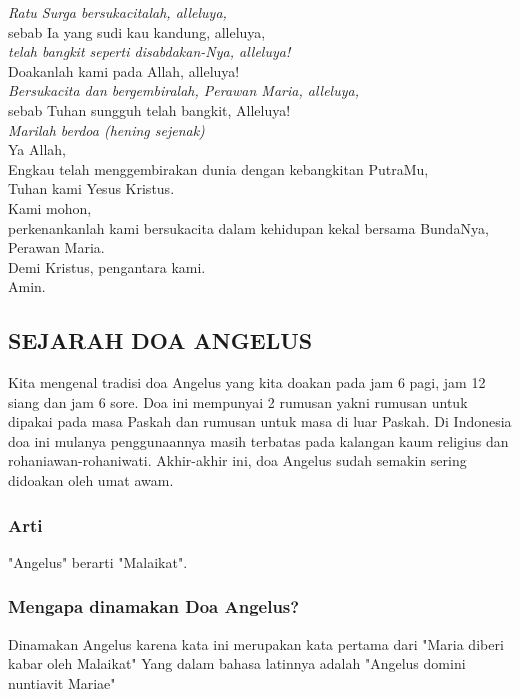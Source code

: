 \documentclass[a5paper,titlepage,11pt]{book}
\begin{document}
\emph{Ratu Surga bersukacitalah, alleluya,}\\
sebab Ia yang sudi kau kandung, alleluya,\\
\emph{telah bangkit seperti disabdakan-Nya, alleluya!}\\
Doakanlah kami pada Allah, alleluya!\\
\emph{Bersukacita dan bergembiralah, Perawan Maria, alleluya,}\\
sebab Tuhan sungguh telah bangkit, Alleluya!\\

\emph{Marilah berdoa (hening sejenak)}\\
Ya Allah, \\
Engkau telah menggembirakan dunia dengan kebangkitan PutraMu,\\ 
Tuhan kami Yesus Kristus. \\
Kami mohon, \\
perkenankanlah kami bersukacita dalam kehidupan kekal bersama BundaNya, Perawan Maria. \\
Demi Kristus, pengantara kami. \\
Amin.


\subsection*{SEJARAH DOA ANGELUS}
\scriptsize

Kita mengenal tradisi doa Angelus yang kita doakan pada jam 6 pagi, jam 12 siang dan jam 6 sore.
Doa ini mempunyai 2 rumusan yakni rumusan untuk dipakai pada masa Paskah dan rumusan untuk masa di luar Paskah.
Di Indonesia doa ini mulanya penggunaannya masih terbatas pada kalangan kaum religius dan rohaniawan-rohaniwati.
Akhir-akhir ini, doa Angelus sudah semakin sering didoakan oleh umat awam.

\subsubsection*{Arti}
"Angelus" berarti "Malaikat".

\subsubsection*{Mengapa dinamakan Doa Angelus?}
Dinamakan Angelus karena kata ini merupakan kata pertama dari "Maria diberi kabar oleh Malaikat"
Yang dalam bahasa latinnya adalah "Angelus domini nuntiavit Mariae"

{~}\newpage \thispagestyle{empty}{~} \newpage \thispagestyle{empty}{~} \newpage {~}
\end{document}
